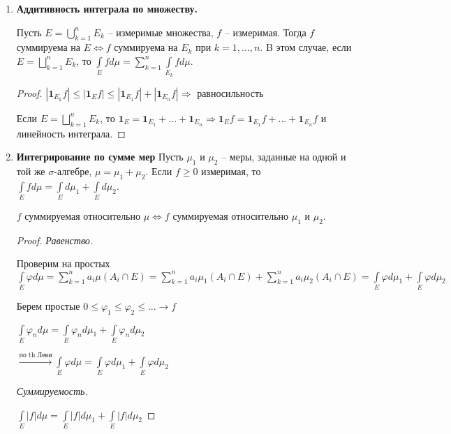 \begin{enumerate}
    \item \textbf{Аддитивность интеграла по множеству.}
    
    Пусть $E=\bigcup\limits_{k=1}^n E_k$ – измеримые множества, $f$ – измеримая. Тогда $f$ суммируема на $E\Leftrightarrow 
    f$ суммируема на $E_k$ при $k=1, ..., n$. B этом случае, если $E=\bigsqcup\limits_{k=1}^n E_k$, то 
    $\int\limits_E f d\mu = \sum\limits_{k=1}^n \int\limits_{E_k} fd \mu$.

    \begin{proof}
        $|\mathbf{1}_{E_k} f|\leq |\mathbf{1}_{E} f|\leq |\mathbf{1}_{E_1} f| + |\mathbf{1}_{E_n} f|\Rightarrow$ равносильность

        Если $E=\bigsqcup\limits_{k=1}^n E_k$, то $\mathbf{1}_{E}=\mathbf{1}_{E_1}+...+\mathbf{1}_{E_n}\Rightarrow 
        \mathbf{1}_{E} f=\mathbf{1}_{E_1} f + ... + \mathbf{1}_{E_n} f$ и линейность интеграла.
    \end{proof}

    \item \textbf{Интегрирование по сумме мер}
    Пусть $\mu_1$ и $\mu_2$ – меры, заданные на одной и той же $\sigma$-алгебре, $\mu = \mu_1 + \mu_2$.
    Если $f\geq 0$ измеримая, то $\int\limits_E f d\mu = \int\limits_E d \mu_1 + \int\limits_E d\mu_2$.

    $f$ суммируемая относительно $\mu\Leftrightarrow f$ суммируемая относительно $\mu_1$ и $\mu_2$.
    
    \begin{proof}
        \textit{Равенство.}

        Проверим на простых $\int\limits_E \varphi d\mu = \sum\limits_{k=1}^n a_i \mu (A_i \cap E)=
        \sum\limits_{k=1}^n a_i \mu_1 (A_i \cap E)+\sum\limits_{k=1}^n a_i \mu_2 (A_i \cap E)=
        \int\limits_E \varphi d\mu_1+\int\limits_E \varphi d\mu_2$

        Берем простые $0\leq \varphi_1 \leq \varphi_2\leq ...\rightarrow f$

        $\int\limits_E \varphi_n d\mu=\int\limits_E \varphi_n d\mu_1+\int\limits_E \varphi_n d\mu_2$

        $\overset{\text{по th Леви}}{\rightarrow} \int\limits_E \varphi d\mu= \int\limits_E \varphi d\mu_1 + \int\limits_E \varphi d\mu_2$
        
        \textit{Суммируемость.}

        $\int\limits_E |f|d\mu = \int\limits_E |f|d\mu_1+\int\limits_E |f|d\mu_2$
    \end{proof}
\end{enumerate}

